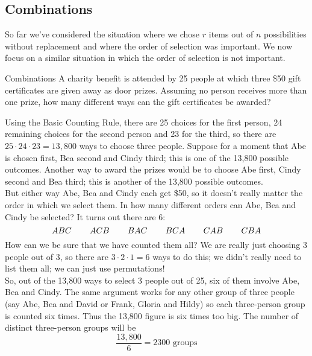 \subsection{Combinations}
So far we've considered the situation where we chose $r$ items out of $n$ possibilities without replacement and where the order of selection was important. We now focus on a similar situation in which the order of selection is not important.

\begin{example}{Combinations}
A charity benefit is attended by 25 people at which three \$50 gift certificates are given away as door prizes. Assuming no person receives more than one prize, how many different ways can the gift certificates be awarded?

\sol
Using the Basic Counting Rule, there are 25 choices for the first person, 24 remaining choices for the second person and 23 for the third, so there are $25 \cdot 24 \cdot 23 = 13,800$ ways to choose three people. Suppose for a moment that Abe is chosen first, Bea second and Cindy third; this is one of the 13,800 possible outcomes. Another way to award the prizes would be to choose Abe first, Cindy second and Bea third; this is another of the 13,800 possible outcomes.\\

But either way Abe, Bea and Cindy each get \$50, so it doesn't really matter the order in which we select them. In how many different orders can Abe, Bea and Cindy be selected? It turns out there are 6:
\[  ABC \hspace{.3in} ACB \hspace{.3in} BAC \hspace{.3in}  BCA \hspace{.3in} CAB \hspace{.3in}CBA \]
How can we be sure that we have counted them all? We are really just choosing 3 people out of 3, so there are $3 \cdot 2 \cdot 1 = 6$ ways to do this; we didn't really need to list them all; we can just use permutations!\\

So, out of the 13,800 ways to select 3 people out of 25, six of them involve Abe, Bea and Cindy. The same argument works for any other group of three people (say Abe, Bea and David or Frank, Gloria and Hildy) so each three-person group is counted six times. Thus the 13,800 figure is six times too big. The number of distinct three-person groups will be
\[\dfrac{13,800}{6} = \boxed{2300 \textrm{ groups}}\]
\end{example}

